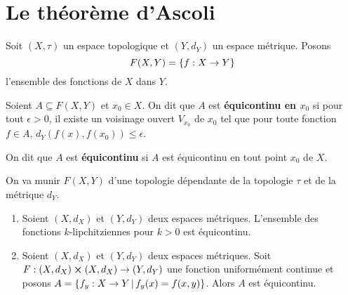 \chapter{Le théorème d'Ascoli}

\begin{definition}
	Soit $(X, \tau)$ un espace topologique et $(Y, d_{Y})$ un espace métrique.
	Posons
	\begin{equation}
		F(X, Y) = \left\{ f : X \rightarrow Y \right\}
	\end{equation}
	l'ensemble des fonctions de $X$ dans $Y$.

	Soient $A \subseteq F(X, Y)$ et $x_{0} \in X$.
	On dit que $A$ est \textbf{équicontinu en $x_{0}$} si pour tout $\epsilon >
	0$, il existe un voisinage ouvert $V_{x_{0}}$ de $x_{0}$ tel que pour toute
	fonction $f \in A$, $d_{Y}(f(x), f(x_{0})) \leq \epsilon$.

	On dit que $A$ est \textbf{équicontinu} si $A$ est équicontinu en tout point
	$x_{0}$ de $X$.
\end{definition}

On va munir $F(X, Y)$ d'une topologie dépendante de la topologie $\tau$ et de
la métrique $d_{Y}$.

\begin{definition} 

\end{definition}

\begin{exemple}
	\begin{enumerate}
		\item Soient $(X, d_{X})$ et $(Y, d_{Y})$ deux espaces métriques.
			L'ensemble des fonctions $k$-lipchitziennes pour $k > 0$ est
			équicontinu.
		\item Soient $(X, d_{X})$ et $(Y, d_{Y})$ deux espaces métriques. Soit
			$F : (X, d_{X}) \cross (X, d_{X}) \rightarrow (Y, d_{Y})$ une
			fonction uniformément continue et posons $A = \left\{f_{y} : X
		\rightarrow Y \, | \, f_{y}(x) = f(x, y) \right\}$. Alors $A$ est équicontinu.
	\end{enumerate}
\end{exemple}


